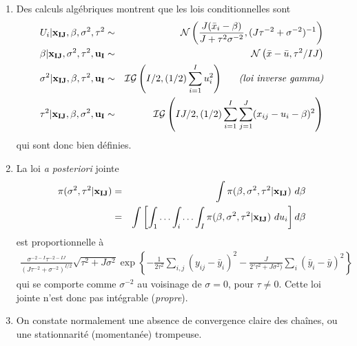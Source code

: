 \begin{rep}
\begin{enumerate}
\item Des calculs algébriques montrent que les lois conditionnelles sont
\begin{eqnarray*}
U_i|{\bf x_{IJ}},\beta,\sigma^2,\tau^2 & \sim & {\cal{N}}\left(\frac{J(\bar{x}_i-\beta)}{J+\tau^2\sigma^{-2}},(J\tau^{-2} + \sigma^{-2})^{-1}\right) \\
\beta|{\bf x_{IJ}},\sigma^2,\tau^2,{\bf u_I} & \sim & {\cal{N}}\left(\bar{x}-\bar{u},\tau^2/IJ\right) \\
\sigma^2|{\bf x_{IJ}},\beta,\tau^2,{\bf u_I} & \sim &  {\cal{IG}}\left(I/2,(1/2)\sum\limits_{i=1}^I u^2_i\right) \ \ \ \ \ \text{\it (loi inverse gamma)} \\
\tau^2|{\bf x_{IJ}},\beta,\sigma^2,{\bf u_I} & \sim &  {\cal{IG}}\left(IJ/2,(1/2)\sum\limits_{i=1}^I\sum\limits_{j=1}^J (x_{ij} - u_i - \beta)^2\right)  
\end{eqnarray*}
qui sont donc bien définies. 
\item La loi {\it a posteriori} jointe 
\begin{eqnarray*}
\pi(\sigma^2,\tau^2|{\bf x_{IJ}}) & = & \int \pi(\beta,\sigma^2,\tau^2|{\bf x_{IJ}}) \ d\beta \\
                                  & = & \int\left[\int_1\ldots\int_i\ldots\int_I \pi(\beta,\sigma^2,\tau^2|{\bf x_{IJ}}) \ d u_i\right] d\beta \\
\end{eqnarray*}
est proportionnelle à
\begin{eqnarray*}
\frac{\sigma^{-2-I}\tau^{-2-IJ}}{\left(J\tau^{-2} + \sigma^{-2}\right)^{I/2}}\sqrt{\tau^2 + J\sigma^2} \exp\left\{-\frac{1}{2\tau^2}\sum\limits_{i,j} (y_{ij}-\bar{y}_i)^2 - \frac{J}{2'\tau^2 + J\sigma^2)}\sum\limits_{i} (\bar{y}_i-\bar{y})^2\right\}
\end{eqnarray*}
qui se comporte comme $\sigma^{-2}$ au voisinage de $\sigma=0$, pour $\tau\neq 0$. Cette loi jointe n'est donc pas intégrable ({\it propre}). 
\item On constate normalement une absence de convergence claire des chaînes, ou une stationnarité (momentanée) trompeuse.
\end{enumerate}
\end{rep}